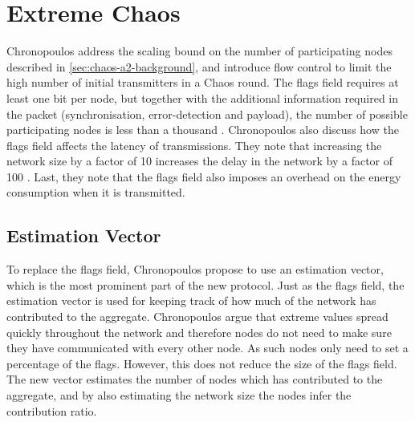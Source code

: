 \section{Extreme Chaos}
Chronopoulos \cite{Chronopoulos2016-extreme-chaos} address the scaling bound on the number of participating nodes described in \cref{sec:chaos-a2-background}, and introduce flow control to limit the high number of initial transmitters in a Chaos round. The flags field requires at least one bit per node, but together with the additional information required in the packet (synchronisation, error-detection and payload), the number of possible participating nodes is less than a thousand \cite{chaos-introduction-paper}. Chronopoulos also discuss how the flags field affects the latency of transmissions. They note that increasing the network size by a factor of 10 increases the delay in the network by a factor of 100 \cite{Chronopoulos2016-extreme-chaos}. Last, they note that the flags field also imposes an overhead on the energy consumption when it is transmitted.

\subsection{Estimation Vector}
To replace the flags field, Chronopoulos propose to use an estimation vector, which is the most prominent part of the new protocol. Just as the flags field, the estimation vector is used for keeping track of how much of the network has contributed to the aggregate. Chronopoulos argue that extreme values spread quickly throughout the network and therefore nodes do not need to make sure they have communicated with every other node. As such nodes only need to set a percentage of the flags. However, this does not reduce the size of the flags field. The new vector estimates the number of nodes which has contributed to the aggregate, and by also estimating the network size the nodes infer the contribution ratio.



